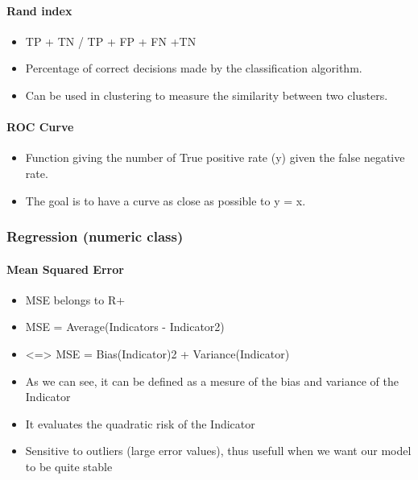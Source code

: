 \documentclass[11pt]{article}
\providecommand{\tightlist}{%
      \setlength{\itemsep}{0pt}\setlength{\parskip}{0pt}}
\begin{document}
    \hypertarget{rand-index}{%
\paragraph{Rand index}\label{rand-index}}

\begin{itemize}
\tightlist
\item
  TP + TN / TP + FP + FN +TN
\item
  Percentage of correct decisions made by the classification algorithm.
\item
  Can be used in clustering to measure the similarity between two
  clusters.
\end{itemize}

    \hypertarget{roc-curve}{%
\paragraph{ROC Curve}\label{roc-curve}}

\begin{itemize}
\tightlist
\item
  Function giving the number of True positive rate (y) given the false
  negative rate.
\item
  The goal is to have a curve as close as possible to y = x.
\end{itemize}

    \hypertarget{regression-numeric-class}{%
\subsubsection{Regression (numeric
class)}\label{regression-numeric-class}}

    \hypertarget{mean-squared-error}{%
\paragraph{Mean Squared Error}\label{mean-squared-error}}

\begin{itemize}
\tightlist
\item
  MSE belongs to R+
\item
  MSE = Average(Indicators - Indicator2)
\item
  \textless=\textgreater{} MSE = Bias(Indicator)2 + Variance(Indicator)
\item
  As we can see, it can be defined as a mesure of the bias and variance
  of the Indicator
\item
  It evaluates the quadratic risk of the Indicator
\item
  Sensitive to outliers (large error values), thus usefull when we want
  our model to be quite stable
\end{itemize}
\end{document}
